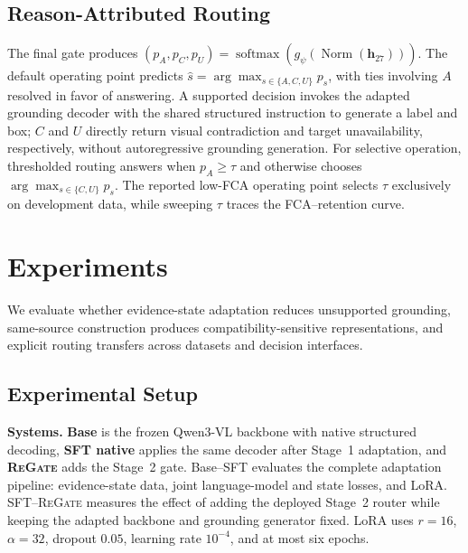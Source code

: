 \documentclass[letterpaper]{article}
\newcommand{\Method}{\textsc{ReGate}\xspace}
\begin{document}
\subsection{Reason-Attributed Routing}
\label{sec:arch}

The final gate produces
$(p_A,p_C,p_U)=\operatorname{softmax}(g_\psi(\operatorname{Norm}(\mathbf h_{27})))$.
The default operating point predicts
$\hat s=\arg\max_{s\in\{A,C,U\}}p_s$, with ties involving $A$ resolved in favor of answering. A supported decision invokes the adapted grounding decoder with the shared structured instruction to generate a label and box; $C$ and $U$ directly return visual contradiction and target unavailability, respectively, without autoregressive grounding generation. For selective operation, thresholded routing answers when $p_A\geq\tau$ and otherwise chooses $\arg\max_{s\in\{C,U\}}p_s$. The reported low-FCA operating point selects $\tau$ exclusively on development data, while sweeping $\tau$ traces the FCA--retention curve.

\section{Experiments}
\label{sec:experiments}

We evaluate whether evidence-state adaptation reduces unsupported grounding, same-source construction produces compatibility-sensitive representations, and explicit routing transfers across datasets and decision interfaces.

\subsection{Experimental Setup}
\label{sec:exp_setup}

\textbf{Systems.}
\textbf{Base} is the frozen Qwen3-VL backbone with native structured decoding, \textbf{SFT native} applies the same decoder after Stage~1 adaptation, and \textbf{\Method} adds the Stage~2 gate. Base--SFT evaluates the complete adaptation pipeline: evidence-state data, joint language-model and state losses, and LoRA. SFT--\Method measures the effect of adding the deployed Stage~2 router while keeping the adapted backbone and grounding generator fixed. LoRA uses $r=16$, $\alpha=32$, dropout $0.05$, learning rate $10^{-4}$, and at most six epochs.
\end{document}
